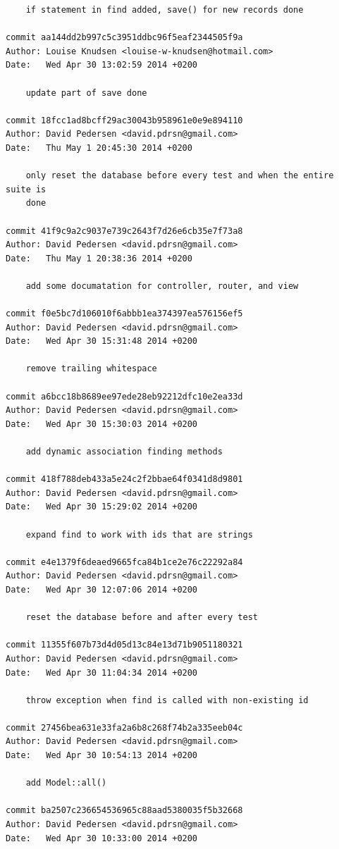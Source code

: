 \documentclass[12pt]{article}
\begin{document}
\begin{verbatim}
    if statement in find added, save() for new records done

commit aa144dd2b997c5c3951ddbc96f5eaf2344505f9a
Author: Louise Knudsen <louise-w-knudsen@hotmail.com>
Date:   Wed Apr 30 13:02:59 2014 +0200

    update part of save done

commit 18fcc1ad8bcff29ac30043b958961e0e9e894110
Author: David Pedersen <david.pdrsn@gmail.com>
Date:   Thu May 1 20:45:30 2014 +0200

    only reset the database before every test and when the entire suite is
    done

commit 41f9c9a2c9037e739c2643f7d26e6cb35e7f73a8
Author: David Pedersen <david.pdrsn@gmail.com>
Date:   Thu May 1 20:38:36 2014 +0200

    add some documatation for controller, router, and view

commit f0e5bc7d106010f6abbb1ea374397ea576156ef5
Author: David Pedersen <david.pdrsn@gmail.com>
Date:   Wed Apr 30 15:31:48 2014 +0200

    remove trailing whitespace

commit a6bcc18b8689ee97ede28eb92212dfc10e2ea33d
Author: David Pedersen <david.pdrsn@gmail.com>
Date:   Wed Apr 30 15:30:03 2014 +0200

    add dynamic association finding methods

commit 418f788deb433a5e24c2f2bbae64f0341d8d9801
Author: David Pedersen <david.pdrsn@gmail.com>
Date:   Wed Apr 30 15:29:02 2014 +0200

    expand find to work with ids that are strings

commit e4e1379f6deaed9665fca84b1ce2e76c22292a84
Author: David Pedersen <david.pdrsn@gmail.com>
Date:   Wed Apr 30 12:07:06 2014 +0200

    reset the database before and after every test

commit 11355f607b73d4d05d13c84e13d71b9051180321
Author: David Pedersen <david.pdrsn@gmail.com>
Date:   Wed Apr 30 11:04:34 2014 +0200

    throw exception when find is called with non-existing id

commit 27456bea631e33fa2a6b8c268f74b2a335eeb04c
Author: David Pedersen <david.pdrsn@gmail.com>
Date:   Wed Apr 30 10:54:13 2014 +0200

    add Model::all()

commit ba2507c236654536965c88aad5380035f5b32668
Author: David Pedersen <david.pdrsn@gmail.com>
Date:   Wed Apr 30 10:33:00 2014 +0200


\end{verbatim}
\end{document}
